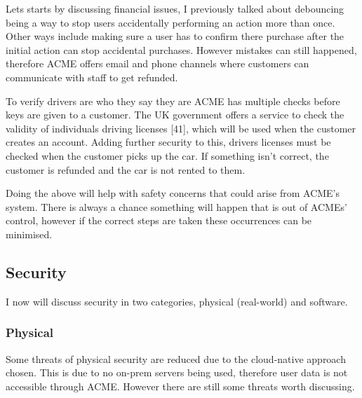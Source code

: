   Lets starts by discussing financial issues, I previously talked about debouncing being a way to stop users accidentally performing an action more than
  once. Other ways include making sure a user has to confirm there purchase after the initial action can stop accidental purchases. However mistakes can 
  still happened, therefore ACME offers email and phone channels where customers can communicate with staff to get refunded.

  To verify drivers are who they say they are ACME has multiple checks before keys are given to a customer. The UK government offers a service to check 
  the validity of individuals driving licenses [41], which will be used when the customer creates an account. Adding further security to this, drivers licenses
  must be checked when the customer picks up the car. If something isn't correct, the customer is refunded and the car is not rented to them.

  Doing the above will help with safety concerns that could arise from ACME's system. There is always a chance something will happen that is out of 
  ACMEs' control, however if the correct steps are taken these occurrences can be minimised.

  \subsection{Security}
  I now will discuss security in two categories, physical (real-world) and software.

  \subsubsection{Physical}
  \vspace{0.2cm}
  Some threats of physical security are reduced due to the cloud-native approach chosen. This is due to no on-prem servers being used, therefore 
  user data is not accessible through ACME. However there are still some threats worth discussing.

